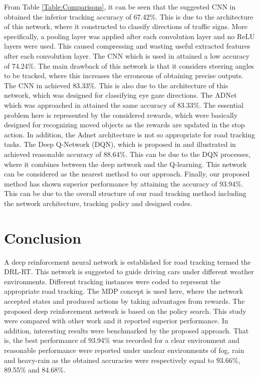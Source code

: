 \documentclass[conference]{IEEEtran}
\begin{document}
	From Table \ref{Table:Comparisons}, it can be seen that the suggested CNN in \cite{Karaduman2017Deep} obtained the inferior tracking accuracy of 67.42\%. This is due to the architecture of this network, where it constructed to classify directions of traffic signs. More specifically, a pooling layer was applied after each convolution layer and no ReLU layers were used. This caused compressing and wasting useful extracted features after each convolution layer. The CNN which is used in \cite{bojarski2016end} attained a low accuracy of 74.24\%. The main drawback of this network is that it considers steering angles to be tracked, where this increases the erroneous of obtaining precise outputs. The CNN in \cite{George2016Real} achieved 83.33\%. This is also due to the architecture of this network, which was designed for classifying eye gaze directions. The ADNet which was approached in \cite{Yun2017Action,Yun2018Action} attained the same accuracy of 83.33\%. 
	The essential problem here is represented by the considered rewards, which were basically designed %
	for recognizing moved objects as the rewards are updated in the stop action. In addition, the Adnet architecture is not so appropriate for road tracking tasks. The Deep Q-Network (DQN), which is proposed in \cite{mnih2015human} and illustrated in \cite{arulkumaran2017brief} achieved reasonable accuracy of 88.64\%. This can be due to the DQN processes, where it combines between the deep network and the Q-learning. This network can be considered as the nearest method to our approach. Finally, our proposed method has shown superior performance by attaining the accuracy of 93.94\%. This can be due to the overall structure of our road tracking method including the network architecture, tracking policy and designed codes.
	
\section{Conclusion}
	A deep reinforcement neural network is established for road tracking termed the DRL-RT. This network is suggested to guide driving cars under different weather environments. Different tracking instances were coded to represent the appropriate road tracking. The MDP concept is used here, where the network accepted states and produced actions by taking advantages from rewards. The proposed deep reinforcement network is based on the policy search. This study were compared with other work and it reported superior performance. In addition, interesting results were benchmarked by the proposed approach. That is, the best performance of 93.94\% was recorded for a clear environment and reasonable performance were reported under unclear environments of fog, rain and heavy-rain as the obtained accuracies were respectively equal to 93.66\%, 89.55\% and 84.68\%. 
\end{document}
